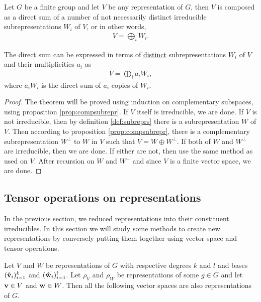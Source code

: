 		\begin{theorem}\label{thm:maschke}
			Let $G$ be a finite group and let $V$ be any representation of $G$, then $V$ is composed as a direct sum of a number of not necessarily distinct irreducible subrepresentations $W_i$ of $V$, or in other words,
			\begin{align}
				V = \bigoplus_i W_i.
			\end{align}
			\begin{note}
				The direct sum can be expressed in terms of \underline{distinct} subrepresentations $W_i$ of $V$ and their multiplicities $a_i$ as
				\begin{align}
					V = \bigoplus_i a_i W_i,
				\end{align}
				where $a_i W_i$ is the direct sum of $a_i$ copies of $W_i$.
			\end{note}
		\end{theorem}
		\begin{proof}
			The theorem will be proved using induction on complementary subspaces, using proposition \ref{prop:compsubrepr}. If $V$ itself is irreducible, we are done. If $V$ is not irreducible, then by definition \ref{def:subreprs} there is a subrepresentation $W$ of $V$. Then according to proposition \ref{prop:compsubrepr}, there is a complementary subrepresentation $W^\perp$ to $W$ in $V$ such that $V = W \oplus W^\perp$. If both of $W$ and $W^\perp$ are irreducible, then we are done. If either are not, then use the same method as used on $V$. After recursion on $W$ and $W^\perp$ and since $V$ is a finite vector space, we are done.
		\end{proof}
	
	\subsection{Tensor operations on representations}\label{sect:tensorops}
	
	In the previous section, we reduced representations into their constituent irreducibles. In this section we will study some methods to create new representations by conversely putting them together using vector space and tensor operations.
	
	Let $V$ and $W$ be representations of $G$ with respective degrees $k$ and $l$ and bases $(\mathbf{\hat{v}}_i)_{i=1}^k$ and $(\mathbf{\hat{w}}_i)_{i=1}^l$. Let $\rho_V$ and $\rho_W$ be representations of some $g \in G$ and let $\mathbf{v} \in V$ and $\mathbf{w} \in W$. Then all the following vector spaces are also representations of $G$.
	
